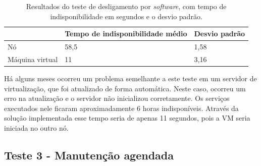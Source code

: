 
\begin{table}[h!]
\caption{Resultados do teste de desligamento por \textit{software}, com tempo de indisponibilidade em segundos e o desvio padrão.}
\small
\label{tab:teste2resultados}
\begin{center}
\begin{tabular}{|l|l|l|}\hline
 & \textbf{Tempo de indisponibilidade médio} & \textbf{Desvio padrão} \\\hline
Nó & 58,5 & 1,58 \\\hline
Máquina virtual & 11 & 3,16 \\\hline
\end{tabular}
\end{center}
\end{table}

Há alguns meses ocorreu um problema semelhante a este teste em um servidor de virtualização, que foi atualizado de forma automática. Neste caso, 
ocorreu um erro na atualização e o servidor não inicializou corretamente. Os serviços executados nele ficaram aproximadamente 
6 horas indisponíveis. Através da solução implementada esse tempo seria de apenas 11 segundos, pois a \ac{VM} seria iniciada no outro nó. 

\subsection{Teste 3 - Manutenção agendada}

